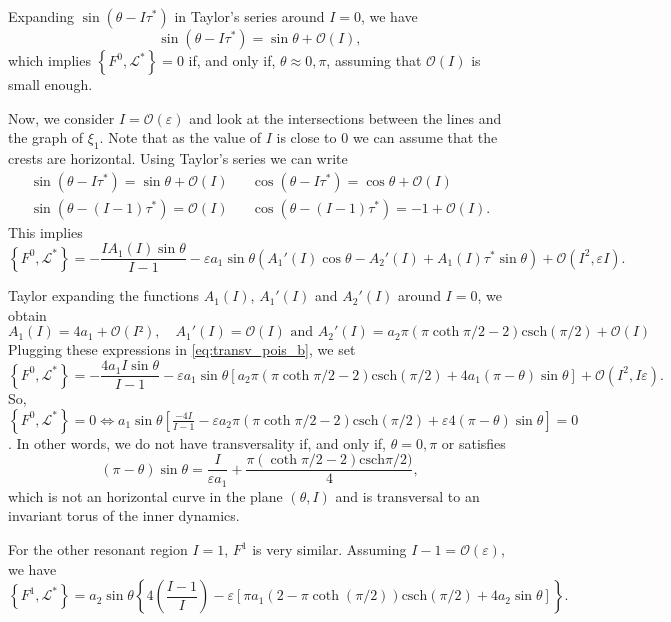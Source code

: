 \documentclass[a4paper,10pt]{article}
\newcommand{\NH}{\text{NHIM}}
\theoremstyle{definition}
\begin{document}
Expanding $\sin(\theta - I\tau^*)$ in Taylor's series around $I = 0$, we have
$$\sin(\theta - I\tau^*) = \sin\theta + \mathcal{O}(I),$$
which implies $\left\{F^0,\mathcal{L}^*\right\}=0$ if, and only if, $\theta \approx 0,\pi$, assuming that $\mathcal{O}(I)$ is small enough.

Now, we consider $I = \mathcal{O}(\varepsilon)$ and look at the intersections between the {\NH} lines and the graph of $\xi_1$.
Note that as the value of $I$ is close to $0$ we can assume that the crests are horizontal.
Using Taylor's series we can write
\begin{eqnarray*}
\sin(\theta - I\tau^*) = \sin\theta + \mathcal{O}(I) && \cos(\theta - I\tau^*) = \cos\theta +  \mathcal{O}(I)\\
\sin(\theta - (I-1)\tau^*) = \mathcal{O}(I) &&\cos(\theta - (I-1)\tau^*) = -1 +\mathcal{O}(I).
\end{eqnarray*}
This implies
\begin{equation}
\left\{F^0 , \mathcal{L}^*\right\}= -\frac{IA_1(I)\sin\theta}{I-1} -\varepsilon a_1\sin\theta\left(A_1'(I)\cos\theta - A_2'(I) + A_1(I)\tau^*\sin\theta \right) + \mathcal{O}(I^2 ,\varepsilon I).\label{eq:transv_pois_b}
\end{equation}

Taylor expanding the functions $A_1(I)$, $A_1'(I)$ and $A_2'(I)$ around $I = 0$, we obtain
\begin{equation*}
A_1(I) = 4a_1 + \mathcal{O}(I²), \quad A_1'(I) = \mathcal{O}(I) \text{ and }  A_2'(I) = a_2\pi(\pi\coth\pi/2 - 2)\text{csch}(\pi/2) + \mathcal{O}(I)
\end{equation*}
Plugging these expressions in \eqref{eq:transv_pois_b}, we set
$$\left\{F^0 , \mathcal{L^*}\right\} =  -\frac{4a_1I\sin\theta}{I-1} -\varepsilon a_1\sin\theta\left[a_2\pi(\pi\coth\pi/2 - 2)\text{csch}(\pi/2) + 4a_1(\pi - \theta)\sin\theta\right]  + \mathcal{O}(I^2 , I\varepsilon).$$
So, $\left\{F^0 , \mathcal{L^*}\right\} = 0 \Leftrightarrow  a_1\sin\theta\left[\frac{-4I}{I-1}-\varepsilon a_2\pi (\pi\coth\pi/2 - 2)\text{csch}(\pi/2) + \varepsilon4(\pi - \theta)\sin\theta\right]= 0$.
In other words, we do not have transversality if, and only if, $\theta = 0,\pi$ or satisfies
$$(\pi - \theta)\sin\theta = \frac{I}{\varepsilon a_1} + \frac{\pi(\coth\pi/2 - 2)\text{csch}\pi/2)}{4},$$
which is not an horizontal curve in the plane $(\theta , I)$ and is transversal to an invariant torus of the inner dynamics.

For the other resonant region $I = 1$, $F^1$ is very similar.
Assuming $I-1 = \mathcal{O}(\varepsilon)$, we have
\begin{equation*}
\left\{F^1 , \mathcal{L}^*\right\} = a_2\sin\theta \left\{4\left(\frac{I-1}{I}\right) - \varepsilon\left[\pi a_1(2-\pi\coth(\pi/2))\text{csch}(\pi/2) + 4 a_2 \sin\theta \right]\right\}.
\end{equation*}
\end{document}
